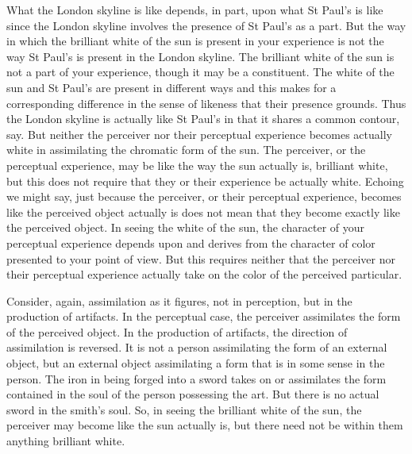 What the London skyline is like depends, in part, upon what St Paul's is like since the London skyline involves the presence of St Paul's as a part. But the way in which the brilliant white of the sun is present in your experience is not the way St Paul's is present in the London skyline. The brilliant white of the sun is not a part of your experience, though it may be a constituent. The white of the sun and St Paul's are present in different ways and this makes for a corresponding difference in the sense of likeness that their presence grounds. Thus the London skyline is actually like St Paul's in that it shares a common contour, say. But neither the perceiver nor their perceptual experience becomes actually white in assimilating the chromatic form of the sun. The perceiver, or the perceptual experience, may be like the way the sun actually is, brilliant white, but this does not require that they or their experience be actually white. Echoing \citet{Austin:1962lr} we might say, just because the perceiver, or their perceptual experience, becomes like the perceived object actually is does not mean that they become exactly like the perceived object. In seeing the white of the sun, the character of your perceptual experience depends upon and derives from the character of color presented to your point of view. But this requires neither that the perceiver nor their perceptual experience actually take on the color of the perceived particular.

Consider, again, assimilation as it figures, not in perception, but in the production of artifacts. In the perceptual case, the perceiver assimilates the form of the perceived object. In the production of artifacts, the direction of assimilation is reversed. It is not a person assimilating the form of an external object, but an external object assimilating a form that is in some sense in the person. The iron in being forged into a sword takes on or assimilates the form contained in the soul of the person possessing the art.  But there is no actual sword in the smith’s soul. So, in seeing the brilliant white of the sun, the perceiver may become like the sun actually is, but there need not be within them anything brilliant white.

